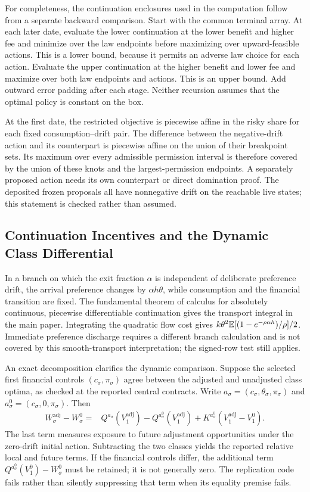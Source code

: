 For completeness, the continuation enclosures used in the computation follow from a separate backward comparison. Start with the common terminal array. At each later date, evaluate the lower continuation at the lower benefit and higher fee and minimize over the law endpoints before maximizing over upward-feasible actions. This is a lower bound, because it permits an adverse law choice for each action. Evaluate the upper continuation at the higher benefit and lower fee and maximize over both law endpoints and actions. This is an upper bound. Add outward error padding after each stage. Neither recursion assumes that the optimal policy is constant on the box.

At the first date, the restricted objective is piecewise affine in the risky share for each fixed consumption--drift pair. The difference between the negative-drift action and its counterpart is piecewise affine on the union of their breakpoint sets. Its maximum over every admissible permission interval is therefore covered by the union of these knots and the largest-permission endpoints. A separately proposed action needs its own counterpart or direct domination proof. The deposited frozen proposals all have nonnegative drift on the reachable live states; this statement is checked rather than assumed.

\subsection{Continuation Incentives and the Dynamic Class Differential}
In a branch on which the exit fraction $\alpha$ is independent of deliberate preference drift, the arrival preference changes by $\alpha h\theta$, while consumption and the financial transition are fixed. The fundamental theorem of calculus for absolutely continuous, piecewise differentiable continuation gives the transport integral in the main paper. Integrating the quadratic flow cost gives $k\theta^2\mathbb E[(1-e^{-\rho\alpha h})/\rho]/2$. Immediate preference discharge requires a different branch calculation and is not covered by this smooth-transport interpretation; the signed-row test still applies.

An exact decomposition clarifies the dynamic comparison. Suppose the selected first financial controls $(c_\sigma,\pi_\sigma)$ agree between the adjusted and unadjusted class optima, as checked at the reported central contracts. Write $a_\sigma=(c_\sigma,\theta_\sigma,\pi_\sigma)$ and $a^0_\sigma=(c_\sigma,0,\pi_\sigma)$. Then
\begin{align}
 W^{\mathrm{adj}}_\sigma-W^0_\sigma
 ={}&Q^{a_\sigma}(V^{\mathrm{adj}}_1)
      -Q^{a^0_\sigma}(V^{\mathrm{adj}}_1)
      +K^{a^0_\sigma}(V^{\mathrm{adj}}_1-V^0_1).
 \label{eq:r11_s_decomp}
\end{align}
The last term measures exposure to future adjustment opportunities under the zero-drift initial action. Subtracting the two classes yields the reported relative local and future terms. If the financial controls differ, the additional term
$Q^{a^0_\sigma}(V^0_1)-W^0_\sigma$ must be retained; it is not generally zero. The replication code fails rather than silently suppressing that term when its equality premise fails.

